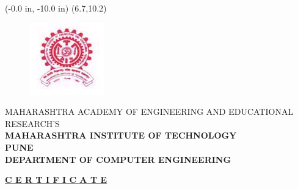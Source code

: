 \documentclass[12pt,a4paper]{report}
\begin{document}
\newpage
\pagestyle{empty}
	\thisfancyput(-0.0 in, -10.0 in) {\setlength{\unitlength}{1 in}\framebox(6.7,10.2)}
\begin{center}
\begin{figure}[h]
\centering
\includegraphics[width=1.5 cm]{MITLogo}
\end{figure}
 MAHARASHTRA ACADEMY OF ENGINEERING AND EDUCATIONAL RESEARCH\textquoteright S\\ \bf \vspace {0.001 in}MAHARASHTRA INSTITUTE OF TECHNOLOGY\\ PUNE\\\vspace {0.001 in} DEPARTMENT OF COMPUTER ENGINEERING\\
\vspace {0.0001 in}
\end{center}
\vspace{0.0005 in}
\begin{center}
\textbf{\underline{C E R T I F I C A T E}}\\
\vspace{0.0005 in}
\end{center}
		\noindent
  				\setlength{\baselineskip}{1.45\baselineskip}
\end{document}
